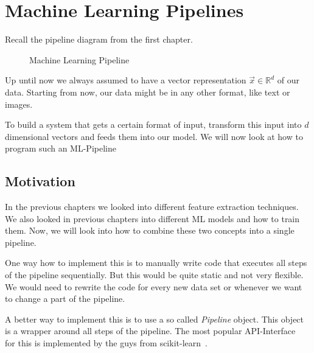 \chapter{Machine Learning Pipelines}
\label{ch:ml-pipeline}
Recall the pipeline diagram from the first chapter.

\begin{figure}[h]
  \centering
  \caption{Machine Learning Pipeline}
  \label{fig:ml-pipeline}
\end{figure}
Up until now we always assumed to have a vector representation $\vec{x}\in\mathbb{R}^d$ of our data.
Starting from now, our data might be in any other format, like text or images.

To build a system that gets a certain format of input, transform this input into $d$ dimensional vectors and feeds them into our model.
We will now look at how to program such an ML-Pipeline
\section{Motivation}
In the previous chapters we looked into different feature extraction techniques.
We also looked in previous chapters into different ML models and how to train them.
Now, we will look into how to combine these two concepts into a single pipeline.

One way how to implement this is to manually write code that executes all steps of the pipeline sequentially.
But this would be quite static and not very flexible. We would need to rewrite the code for every new data set or whenever
we want to change a part of the pipeline.

A better way to implement this is to use a so called \textit{Pipeline} object. This object is a wrapper around all steps of the pipeline.
The most popular API-Interface~\cite{sklearn_api} for this is implemented by the guys from scikit-learn~\cite{scikit-learn}.

